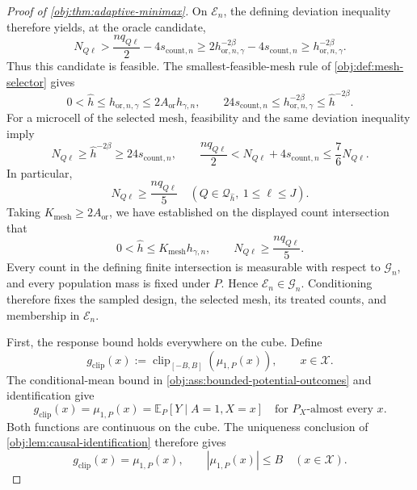 \begin{proof}[Proof of \cref{obj:thm:adaptive-minimax}]
On \(\mathcal E_n\), the defining deviation inequality therefore yields, at the oracle candidate,
\[
N_{Q\ell}
>\frac{nq_{Q\ell}}2-4s_{\mathrm{count},n}
\ge2h_{\mathrm{or},n,\gamma}^{-2\beta}
 -4s_{\mathrm{count},n}
\ge h_{\mathrm{or},n,\gamma}^{-2\beta}.
\]
Thus this candidate is feasible. The smallest-feasible-mesh rule of \cref{obj:def:mesh-selector} gives
\[
0<\widehat h\le h_{\mathrm{or},n,\gamma}
\le2A_{\mathrm{or}}h_{\gamma,n},
\qquad
24s_{\mathrm{count},n}
\le h_{\mathrm{or},n,\gamma}^{-2\beta}
\le\widehat h^{-2\beta}.
\]
For a microcell of the selected mesh, feasibility and the same deviation inequality imply
\[
N_{Q\ell}\ge\widehat h^{-2\beta}
\ge24s_{\mathrm{count},n},
\qquad
\frac{nq_{Q\ell}}2
<N_{Q\ell}+4s_{\mathrm{count},n}
\le\frac76N_{Q\ell}.
\]
In particular,
\[
N_{Q\ell}\ge\frac{nq_{Q\ell}}5
\quad(Q\in\mathcal Q_{\widehat h},\ 1\le\ell\le J).
\]
Taking \(K_{\mathrm{mesh}}\ge2A_{\mathrm{or}}\), we have established on the displayed count intersection that
\[
0<\widehat h\le K_{\mathrm{mesh}}h_{\gamma,n},
\qquad
N_{Q\ell}\ge\frac{nq_{Q\ell}}5.
\]
Every count in the defining finite intersection is measurable with respect to \(\mathcal G_n\), and every population mass is fixed under \(P\). Hence \(\mathcal E_n\in\mathcal G_n\). Conditioning therefore fixes the sampled design, the selected mesh, its treated counts, and membership in \(\mathcal E_n\).

First, the response bound holds everywhere on the cube. Define
\[
g_{\mathrm{clip}}(x)
:=
\operatorname{clip}_{[-B,B]}(\mu_{1,P}(x)),
\qquad x\in\mathcal X.
\]
The conditional-mean bound in \cref{obj:ass:bounded-potential-outcomes} and identification give
\[
g_{\mathrm{clip}}(x)
=
\mu_{1,P}(x)
=
\mathbb E_P[Y\mid A=1,X=x]
\quad\text{for }P_X\text{-almost every }x.
\]
Both functions are continuous on the cube. The uniqueness conclusion of \cref{obj:lem:causal-identification} therefore gives
\[
g_{\mathrm{clip}}(x)=\mu_{1,P}(x),
\qquad
|\mu_{1,P}(x)|\le B
\quad(x\in\mathcal X).
\]


\end{proof}
